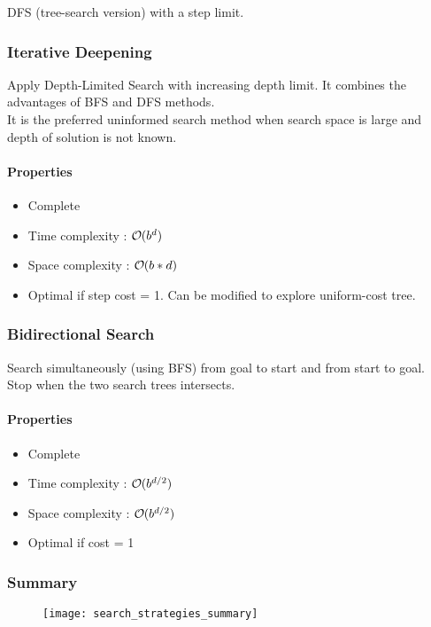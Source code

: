 DFS (tree-search version) with a step limit.

\subsubsection{Iterative Deepening}

Apply Depth-Limited Search with increasing depth limit. It combines the advantages of BFS and DFS methods.\\
It is the preferred uninformed search method when search space is large and depth of solution is not known.

\paragraph{Properties}
\begin{itemize}
\item Complete
\item Time complexity : $\bigO (b^d)$
\item Space complexity : $\bigO (b*d)$
\item Optimal if step cost = 1. Can be modified to explore uniform-cost tree.
\end{itemize}

\newpage
\subsubsection{Bidirectional Search}

Search simultaneously (using BFS) from goal to start and from start to goal. Stop when the two search trees intersects.

\paragraph{Properties}
\begin{itemize}
\item Complete
\item Time complexity : $\bigO (b^{d/2})$
\item Space complexity : $\bigO (b^{d/2})$
\item Optimal if cost = 1
\end{itemize}

\subsubsection{Summary}

\begin{figure}[H]
    \centering
    \texttt{[image: search\_strategies\_summary]}
\end{figure}

